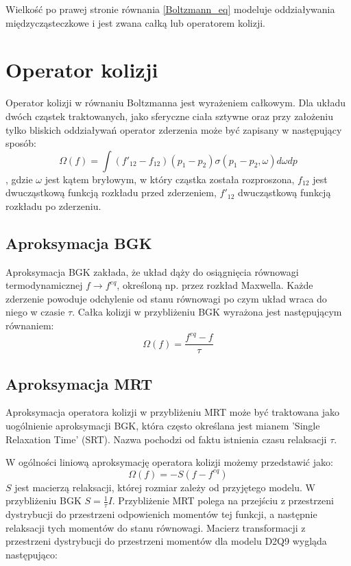\documentclass[a4paper,11pt,twoside]{article}
\begin{document}
Wielkość po prawej stronie równania \ref{Boltzmann_eq} modeluje oddziaływania międzycząsteczkowe i jest zwana całką lub operatorem kolizji.

\section{Operator kolizji}
Operator kolizji w równaniu Boltzmanna jest wyrażeniem całkowym. Dla układu dwóch cząstek traktowanych, jako sferyczne ciała sztywne oraz przy założeniu tylko bliskich oddziaływań operator zderzenia może być zapisany w następujący sposób:
\begin{equation}
\Omega(f) = \int (f'_{12} - f_{12})(p_1 - p_2) \sigma(p_1 - p_2, \omega ) d\omega dp
\label{collision_eq}
\end{equation}
, gdzie $\omega$ jest kątem bryłowym, w który cząstka została rozproszona, $f_{12}$ jest dwucząstkową funkcją rozkładu przed zderzeniem, $f'_{12}$ dwucząstkową funkcją rozkładu po zderzeniu.
\subsection{Aproksymacja BGK}
Aproksymacja BGK zakłada, że układ dąży do osiągnięcia równowagi termodynamicznej $f \rightarrow f^{eq}$, określoną np. przez rozkład Maxwella. Każde zderzenie powoduje odchylenie od stanu równowagi po czym układ wraca do niego w czasie $\tau$. Całka kolizji w przybliżeniu BGK wyrażona jest następującym równaniem:
\begin{equation}
\Omega(f) = \frac{f^{eq}-f}{\tau}
\label{BGK_eq}
\end{equation}


\subsection{Aproksymacja MRT}
Aproksymacja operatora kolizji w przybliżeniu MRT może być traktowana jako uogólnienie aproksymacji BGK, która często określana jest mianem 'Single Relaxation Time' (SRT). Nazwa pochodzi od faktu istnienia czasu relaksacji $\tau$.

W ogólności liniową aproksymację operatora kolizji możemy przedstawić jako:
\begin{equation}
\Omega(f) = -S(f- f^{eq})
\label{relaxation_eq}
\end{equation}
$S$ jest macierzą relaksacji, której rozmiar zależy od przyjętego modelu. W przybliżeniu BGK $S=\frac{1}{\tau}I$.
Przybliżenie MRT polega na przejściu z przestrzeni dystrybucji do przestrzeni odpowienich momentów tej funkcji, a następnie relaksacji tych momentów do stanu równowagi. Macierz transformacji z przestrzeni dystrybucji do przestrzeni momentów dla modelu D2Q9 wygląda następująco:
\end{document}
